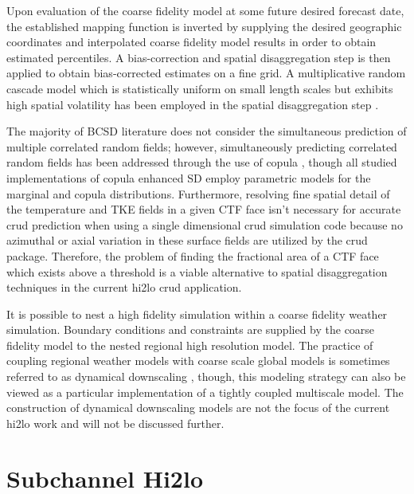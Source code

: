 Upon evaluation of the coarse fidelity model at some future desired forecast date, the established mapping function is inverted by supplying the desired geographic coordinates and interpolated coarse fidelity model results in order to obtain estimated percentiles.   A bias-correction and spatial disaggregation step is then applied to obtain bias-corrected estimates on a fine grid.  A multiplicative random cascade model which is statistically uniform on small length scales but exhibits high spatial volatility has been employed in the spatial disaggregation step \cite{hess2007}.  

The majority of BCSD literature does not consider the simultaneous prediction of multiple correlated random fields; however, simultaneously predicting correlated random fields has been addressed through the use of copula \cite{alaya2014}, though all studied implementations of copula enhanced SD employ parametric models for the marginal and copula distributions.  Furthermore, resolving fine spatial detail of the temperature and TKE fields in a given CTF face isn't necessary for accurate crud prediction when using a single dimensional crud simulation code because no azimuthal or axial variation in these surface fields are utilized by the crud package.  Therefore, the problem of finding the fractional area of a CTF face which exists above a threshold is a viable alternative to spatial disaggregation techniques in the current hi2lo crud application.

It is possible to nest a high fidelity simulation within a coarse fidelity weather simulation. Boundary conditions and constraints are supplied by the coarse fidelity model to the nested regional high resolution model.  The practice of coupling regional weather models with coarse scale global models is sometimes referred to as dynamical downscaling \cite{Caldwell2009}, though, this modeling strategy can also be viewed as a particular implementation of a tightly coupled multiscale model.  The construction of dynamical downscaling models are not the focus of the current hi2lo work and will not be discussed further.



\section{Subchannel Hi2lo}

